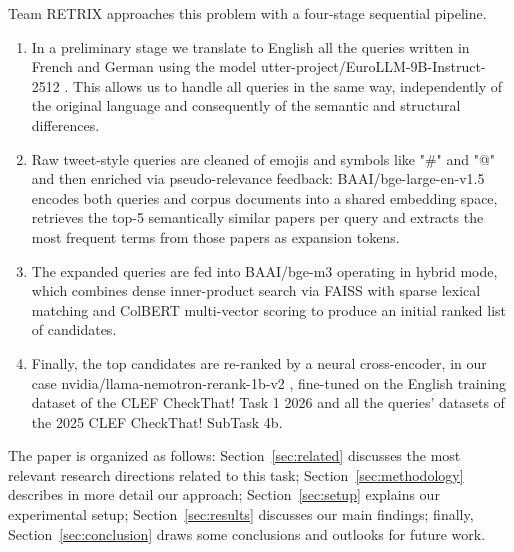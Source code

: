 Team RETRIX approaches this problem with a four-stage sequential pipeline.
\begin{enumerate}
    \item In a preliminary stage we translate to English all the queries written in French and German using the model utter-project/EuroLLM-9B-Instruct-2512 \cite{utter_project_eurollm_9b_instruct_2512}. This allows us to handle all queries in the same way, independently of the original language and consequently of the semantic and structural differences.

    \item Raw tweet-style queries are cleaned of emojis and symbols like "\#" and "@" and then enriched via pseudo-relevance feedback: BAAI/bge-large-en-v1.5 \cite{bge-large-en-v1.5} encodes both queries and corpus documents into a shared embedding space, retrieves the top-5 semantically similar papers per query and extracts the most frequent terms from those papers as expansion tokens.

    \item The expanded queries are fed into BAAI/bge-m3 \cite{bge-m3} operating in hybrid mode, which combines dense inner-product search via FAISS \cite{faiss_documentation} with sparse lexical matching and ColBERT multi-vector scoring to produce an initial ranked list of candidates.

    \item Finally, the top candidates are re-ranked by a neural cross-encoder, in our case nvidia/llama-nemotron-rerank-1b-v2 \cite{llama-nemotron-rerank-1b-v2}, fine-tuned on the English training dataset of the CLEF CheckThat! Task 1 2026 and all the queries' datasets of the 2025 CLEF CheckThat! SubTask 4b.
\end{enumerate}

The paper is organized as follows: Section~\ref{sec:related} discusses the most relevant research directions related to this task; Section~\ref{sec:methodology} describes in more detail our approach; Section~\ref{sec:setup} explains our experimental setup; Section~\ref{sec:results} discusses our main findings; finally, Section~\ref{sec:conclusion} draws some conclusions and outlooks for future work. 
